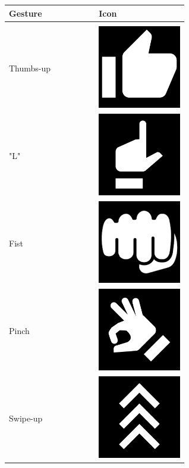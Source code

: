 \documentclass[12pt,a4paper,twoside]{report}
\begin{document}
\begin{table}[h]
  \centering
  \begin{tabular}{ m{0.3\linewidth} m{0.3\linewidth} }
    Gesture & Icon \\
    \hline
    \\
    Thumbs-up & \includegraphics[width=0.3\linewidth]{img/thumbs-up.png} \\
    "L" & \includegraphics[width=0.3\linewidth]{img/thumb-index-extended.png} \\
    Fist & \includegraphics[width=0.3\linewidth]{img/fist.png} \\
    Pinch & \includegraphics[width=0.3\linewidth]{img/pinch.png} \\ 
    Swipe-up & \includegraphics[width=0.3\linewidth]{img/swipe-up.png} \\

\end{tabular}
\end{table}
\end{document}
